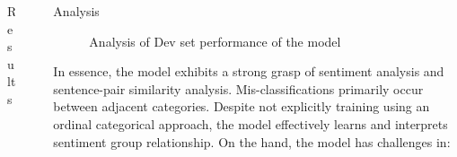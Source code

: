 \documentclass[final]{beamer}
\newlength{\sepwidth}
\newlength{\colwidth}
\newcommand{\separatorcolumn}{\begin{column}{\sepwidth}\end{column}}
\begin{document}
\begin{frame}[t]
\begin{columns}[t]
\begin{column}{\colwidth}
\begin{block}{Results}
  \end{block}

\end{column}

\separatorcolumn

\begin{column}{\colwidth}

  \begin{block}{Analysis}
    \begin{figure}[H]%
      \centering
      \hfill
      \hfill
      \caption{Analysis of Dev set performance of the model
      }%
      \label{fig:analysis}%
    \end{figure}
    In essence, the model exhibits a strong grasp of 
    sentiment analysis and sentence-pair similarity analysis.
    Mis-classifications primarily 
    occur between adjacent categories. Despite not explicitly training using an 
    ordinal categorical approach, the model effectively learns and interprets sentiment group
    relationship. On the hand, the model has challenges in:
    \begin{itemize}

\end{itemize}
\end{block}
\end{column}
\end{columns}
\end{frame}
\end{document}
